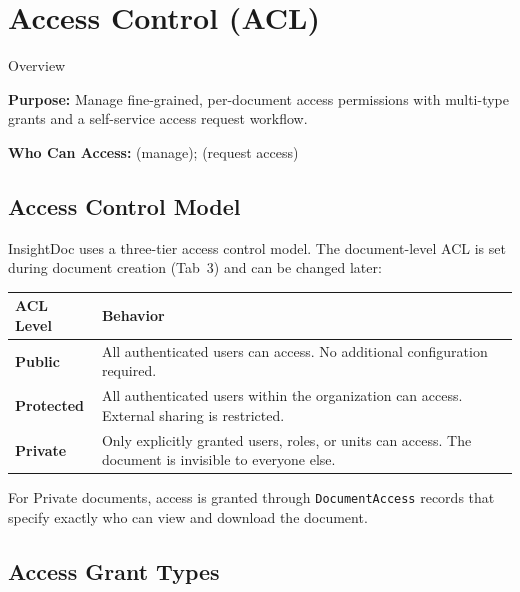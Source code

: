 \section{Access Control (ACL)}

\begin{ugModule}{Overview}

  \textbf{Purpose:}
  Manage fine-grained, per-document access permissions with
  multi-type grants and a self-service access request workflow.

  \textbf{Who Can Access:}
    (manage);
   (request access)
\end{ugModule}

\subsection{Access Control Model}

InsightDoc uses a three-tier access control model. The
document-level ACL is set during document creation (Tab~3)
and can be changed later:

\begin{tabularx}{\textwidth}{@{} l X @{}}
  \toprule
  \textbf{ACL Level} & \textbf{Behavior} \\
  \midrule
  \textbf{Public}
    & All authenticated users can access. No additional
      configuration required. \\
  \textbf{Protected}
    & All authenticated users within the organization can
      access. External sharing is restricted. \\
  \textbf{Private}
    & Only explicitly granted users, roles, or units can
      access. The document is invisible to everyone else. \\
  \bottomrule
\end{tabularx}

For Private documents, access is granted through
\texttt{DocumentAccess} records that specify exactly who
can view and download the document.

\subsection{Access Grant Types}

